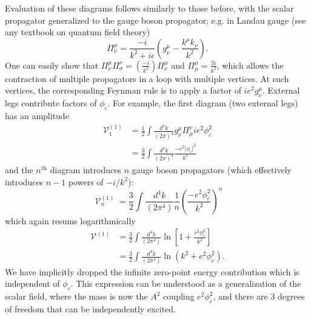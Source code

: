 \documentclass[%
 reprint,
nofootinbib,
 amsmath,amssymb,
 aps,
floatfix,
]{revtex4-1}
\DeclareMathOperator{\V}{\mathcal{V}}
\begin{document}
Evaluation of these diagrams follows similarly to those before, with the scalar propagator generalized to the gauge boson propagator; e.g. in Landau gauge (see any textbook on quantum field theory) \cite{quiros99}
\begin{equation}
    \Pi^\mu_\nu = \frac{-i}{k^2+i\epsilon} \left(g^\mu_\nu - \frac{k^\mu k_\nu}{k^2}\right).
\end{equation}
One can easily show that $\Pi^\mu_\nu \Pi^\nu_\sigma = \left(\frac{-i}{k^2}\right) \Pi^\mu_\nu$ and $\Pi^\mu_\mu = \frac{3i}{k^2}$, which allows the contraction of multiple propagators in a loop with multiple vertices.
At such vertices, the corresponding Feynman rule is to apply a factor of $ie^2g^\mu_\nu$.
External legs contribute factors of $\phi_c$.
For example, the first diagram (two external legs) has an amplitude
\begin{equation}
\begin{split}
    \V^{(1)}_1 &= \frac{1}{2} \int \frac{d^4k}{(2\pi)^4} g^\mu_\nu \Pi_\mu^\nu ie^2\phi_c^2 \\
    &= \frac{3}{2} \int \frac{d^4k}{(2\pi)^4} \frac{-e^2|\phi_c|^2}{k^2}
\end{split}
\end{equation}
and the $n^\text{th}$ diagram introduces $n$ gauge boson propagators (which effectively introduces $n-1$ powers of $-i/k^2$):
\begin{equation}
    \V^{(1)}_n = \frac{3}{2} \int \frac{d^4k}{(2\pi^4)} \frac{1}{n} \left(\frac{-e^2\phi_c^2}{k^2}\right)^n
\end{equation}
which again resums logarithmically
\begin{align}
    \V^{(1)} &= \frac{3}{2} \int \frac{d^4k}{(2\pi^4)} \ln \left[1 + \frac{e^2\phi_c^2}{k^2}\right] \\
    &= \frac{3}{2} \int \frac{d^4k}{(2\pi^4)} \ln \left(k^2 + e^2 \phi_c^2\right).
\end{align}
We have implicitly dropped the infinite zero-point energy contribution which is independent of $\phi_c$.
This expression can be understood as a generalization of the scalar field, where the mass is now the $A^2$ coupling $e^2\phi_c^2$, and there are 3 degrees of freedom that can be independently excited.
\end{document}
